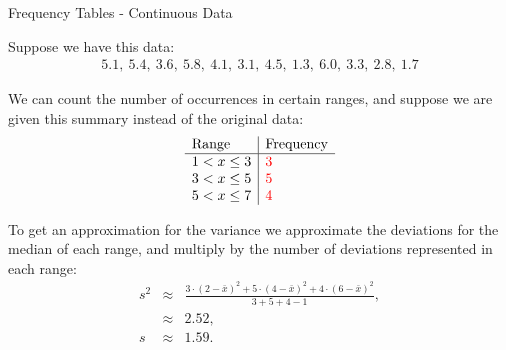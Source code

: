 \begin{frame}{Frequency Tables - Continuous Data}

  Suppose we have this data:
  \begin{eqnarray*}
    5.1,~5.4,~3.6,~5.8,~4.1,~3.1,~4.5,~1.3,~6.0,~3.3,~2.8,~1.7
  \end{eqnarray*}

  We can count the number of occurrences in certain ranges, and
  suppose we are given this summary instead of the original data:
    \begin{eqnarray*}
      \begin{array}{l|l}
        \mathrm{Range}   & \mathrm{Frequency} \\ \hline
        1<x\leq 3 & {\color{red}3} \\
        3<x\leq 5 & {\color{red}5} \\
        5<x\leq 7 & {\color{red}4} \\
      \end{array}
    \end{eqnarray*}

    To get an approximation for the variance we approximate the
    deviations for the median of each range, and multiply by the
    number of deviations represented in each range:
    \begin{eqnarray*}
      s^2 & \approx & \frac{3\cdot (2-\bar{x})^2 + 
                            5 \cdot (4-\bar{x})^2 + 
                            4 \cdot (6-\bar{x})^2}{3+5+4-1}, \\
      & \approx & 2.52, \\
      s & \approx & 1.59.
    \end{eqnarray*}

  
\end{frame}


